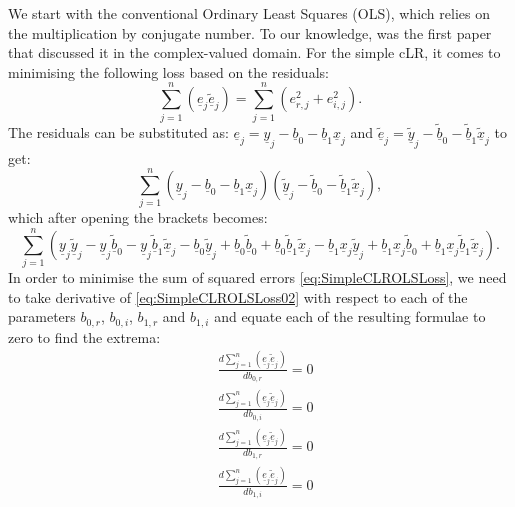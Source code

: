 \documentclass[
]{book}
\begin{document}
We start with the conventional Ordinary Least Squares (OLS), which relies on the multiplication by conjugate number. To our knowledge, \citet{VandenBos1994} was the first paper that discussed it in the complex-valued domain. For the simple cLR, it comes to minimising the following loss based on the residuals:
\begin{equation}
    \sum_{j=1}^n (\underline{e}_j \underline{\tilde{e}}_j) = \sum_{j=1}^n (e_{r,j}^2 + e_{i,j}^2).
    \label{eq:SimpleCLROLSLoss}
\end{equation}
The residuals can be substituted as: \(\underline{e}_j = \underline{y}_j - \underline{b}_0 - \underline{b}_1 \underline{x}_j\) and \(\underline{\tilde{e}}_j = \underline{\tilde{y}}_j - \underline{\tilde{b}}_0 - \underline{\tilde{b}}_1 \underline{\tilde{x}}_j\) to get:
\begin{equation}
    \sum_{j=1}^n (\underline{y}_j - \underline{b}_0 - \underline{b}_1 \underline{x}_j) (\underline{\tilde{y}}_j - \underline{\tilde{b}}_0 - \underline{\tilde{b}}_1 \underline{\tilde{x}}_j),
    \label{eq:SimpleCLROLSLoss01}
\end{equation}
which after opening the brackets becomes:
\begin{equation}
    \sum_{j=1}^n \left(\underline{y}_j \underline{\tilde{y}}_j - \underline{y}_j \underline{\tilde{b}}_0 - \underline{y}_j \underline{\tilde{b}}_1 \underline{\tilde{x}}_j - \underline{b}_0\underline{\tilde{y}}_j + \underline{b}_0 \underline{\tilde{b}}_0 + \underline{b}_0 \underline{\tilde{b}}_1 \underline{\tilde{x}}_j - \underline{b}_1 \underline{x}_j \underline{\tilde{y}}_j + \underline{b}_1 \underline{x}_j \underline{\tilde{b}}_0 + \underline{b}_1 \underline{x}_j \underline{\tilde{b}}_1 \underline{\tilde{x}}_j \right) .
    \label{eq:SimpleCLROLSLoss02}
\end{equation}
In order to minimise the sum of squared errors \eqref{eq:SimpleCLROLSLoss}, we need to take derivative of \eqref{eq:SimpleCLROLSLoss02} with respect to each of the parameters \(b_{0,r}\), \(b_{0,i}\), \(b_{1,r}\) and \(b_{1,i}\) and equate each of the resulting formulae to zero to find the extrema:
\begin{equation}
    \begin{aligned}
        & \frac{d \sum_{j=1}^n (\underline{e}_j \underline{\tilde{e}}_j)}{d b_{0,r}} = 0 \\
        & \frac{d \sum_{j=1}^n (\underline{e}_j \underline{\tilde{e}}_j)}{d b_{0,i}} = 0 \\
        & \frac{d \sum_{j=1}^n (\underline{e}_j \underline{\tilde{e}}_j)}{d b_{1,r}} = 0 \\
        & \frac{d \sum_{j=1}^n (\underline{e}_j \underline{\tilde{e}}_j)}{d b_{1,i}} = 0
    \end{aligned}
    \label{eq:SimpleCLROLSLossSystem01}
\end{equation}
\end{document}

